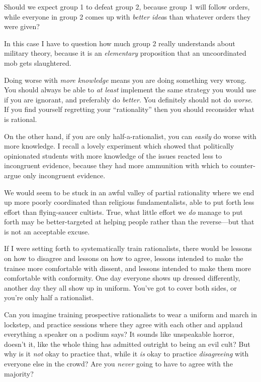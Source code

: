 {
 Should we expect group 1 to defeat group 2, because group 1 will
follow orders, while everyone in group 2 comes up with \textit{better
idea}s than whatever orders they were given?}

{
 In this case I have to question how much group 2 really
understands about military theory, because it is an \textit{elementary}
proposition that an uncoordinated mob gets slaughtered.}

{
 Doing worse with \textit{more knowledge} means you are doing
something very wrong. You should always be able to \textit{at least}
implement the same strategy you would use if you are ignorant, and
preferably do \textit{better}. You definitely should not do
\textit{worse}. If you find yourself regretting your
``rationality'' then you should
reconsider what is rational.}

{
 On the other hand, if you are only half-a-rationalist, you can
\textit{easily} do worse with more knowledge. I recall a lovely
experiment which showed that politically opinionated students with more
knowledge of the issues reacted less to incongruent evidence, because
they had more ammunition with which to counter-argue only incongruent
evidence.}

{
 We would seem to be stuck in an awful valley of partial
rationality where we end up more poorly coordinated than religious
fundamentalists, able to put forth less effort than flying-saucer
cultists. True, what little effort we \textit{do} manage to put forth
may be better-targeted at helping people rather than the reverse---but
that is not an acceptable excuse.}

{
 If I were setting forth to systematically train rationalists,
there would be lessons on how to disagree and lessons on how to agree,
lessons intended to make the trainee more comfortable with dissent, and
lessons intended to make them more comfortable with conformity. One day
everyone shows up dressed differently, another day they all show up in
uniform. You've got to cover both sides, or
you're only half a rationalist.}

{
 Can you imagine training prospective rationalists to wear a
uniform and march in lockstep, and practice sessions where they agree
with each other and applaud everything a speaker on a podium says? It
sounds like unspeakable horror, doesn't it, like the
whole thing has admitted outright to being an evil cult? But why is it
\textit{not} okay to practice that, while it \textit{is} okay to
practice \textit{disagreeing} with everyone else in the crowd? Are you
\textit{never} going to have to agree with the majority?}

